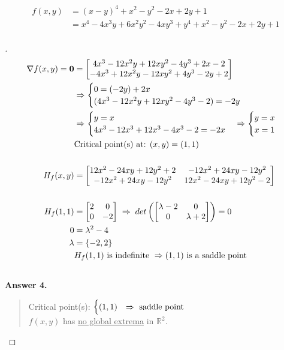 \documentclass[12pt]{article}
\newenvironment{exercise}[2][Exercise]{\begin{trivlist}
\item[\hskip \labelsep {\bfseries #1}\hskip \labelsep {\bfseries #2.}]}{\end{trivlist}}
\begin{document}
\pagebreak
\begin{exercise}{4}
	\begin{align*}
		f(x,y) &= (x - y)^4 + x^2 - y^2 - 2x + 2y + 1 \\
		 &= x^4 - 4x^3y + 6x^2y^2 - 4xy^3 + y^4 + x^2 - y^2 - 2x + 2y + 1 \\
	\end{align*}
\end{exercise}
\begin{proof}[]
	\begin{align*}
		\nabla f(x,y) = \bm{0} &= \begin{bmatrix} 4x^3 - 12x^2y + 12xy^2 - 4y^3 + 2x - 2 \\ -4x^3 + 12x^2y - 12xy^2 + 4y^3 - 2y + 2 \end{bmatrix} \\
		&\Rightarrow
		\begin{cases} 0 = (-2y) + 2x \\ (4x^3 - 12x^2y + 12xy^2 - 4y^3 - 2) = -2y \end{cases} \\
		& \Rightarrow
		\begin{cases} y = x \\ 4x^3 - 12x^3 + 12x^3 - 4x^3 - 2 = -2x\end{cases}
		\Rightarrow
		\begin{cases} y = x \\ x = 1 \end{cases}  \\
		& \textnormal{Critical point(s) at: } (x,y) = (1, 1) \\[15pt]
		H_f(x,y) &= \begin{bmatrix} 12x^2 - 24xy + 12y^2 + 2 & -12x^2 + 24xy - 12y^2 \\ -12x^2 + 24xy - 12y^2 & 12x^2 - 24xy + 12y^2 - 2 \end{bmatrix} \\[15pt]
		H_f(1, 1) &= \begin{bmatrix} 2 & 0 \\ 0 & -2 \end{bmatrix} \; \Rightarrow \; det\left( \begin{bmatrix} \lambda -2 & 0 \\ 0 & \lambda + 2 \end{bmatrix} \right) = 0 \\
		0 &= \lambda^2 - 4 \\
		\lambda &= \left\lbrace -2, 2 \right\rbrace \\
		& H_f(1, 1) \textnormal{ is indefinite } \Rightarrow (1, 1) \textnormal{ is a saddle point} \\[15pt]
	\end{align*}
	\textbf{Answer 4.} \vspace{-5mm} \\
	\begin{quote}
		Critical point(s): $ \begin{cases}
		(1, 1) & \Rightarrow \textnormal{ saddle point} \\
		\end{cases}	$ \\
		$f(x,y)$ has \underline{no global extrema} in $\mathbb{R}^2$.
	\end{quote}
\end{proof}
\end{document}
